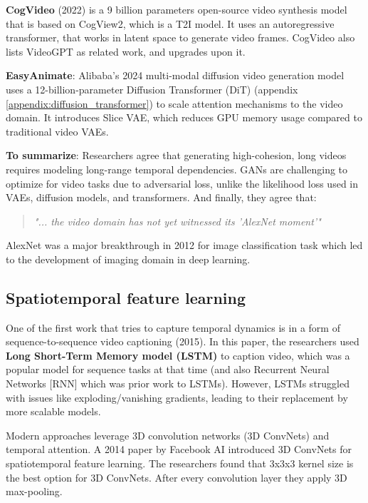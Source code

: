 \textbf{CogVideo} (2022) \cite{cogvideo} is a 9 billion parameters open-source video synthesis model that is based on CogView2, which is a T2I model. It uses an autoregressive transformer, that works in latent space to generate video frames. CogVideo also lists VideoGPT as related work, and upgrades upon it.

\textbf{EasyAnimate}: Alibaba's 2024 multi-modal diffusion video generation model \cite{easyanimate} uses a 12-billion-parameter Diffusion Transformer (DiT) (appendix \ref{appendix:diffusion_transformer}) to scale attention mechanisms to the video domain. It introduces Slice VAE, which reduces GPU memory usage compared to traditional video VAEs.

\textbf{To summarize}: Researchers agree that generating high-cohesion, long videos requires modeling long-range temporal dependencies. GANs are challenging to optimize for video tasks due to adversarial loss, unlike the likelihood loss used in VAEs, diffusion models, and transformers. And finally, they agree that:

\begin{quote}
    \textit{"... the video domain has not yet witnessed its 'AlexNet moment'"} \cite{tran2018closer}
\end{quote}

AlexNet \cite{alexnet} was a major breakthrough in 2012 for image classification task which led to the development of imaging domain in deep learning.










\subsection{Spatiotemporal feature learning}

One of the first work that tries to capture temporal dynamics is in a form of sequence-to-sequence video captioning \cite{venugopalan2015sequence} (2015). In this paper, the researchers used \textbf{Long Short-Term Memory model (LSTM)} to caption video, which was a popular model for sequence tasks at that time (and also Recurrent Neural Networks [RNN] which was prior work to LSTMs). However, LSTMs struggled with issues like exploding/vanishing gradients, leading to their replacement by more scalable models.

Modern approaches leverage 3D convolution networks (3D ConvNets) and temporal attention. A 2014 paper \cite{tran2015learning} by Facebook AI introduced 3D ConvNets for spatiotemporal feature learning. The researchers found that 3x3x3 kernel size is the best option for 3D ConvNets. After every convolution layer they apply 3D max-pooling.


